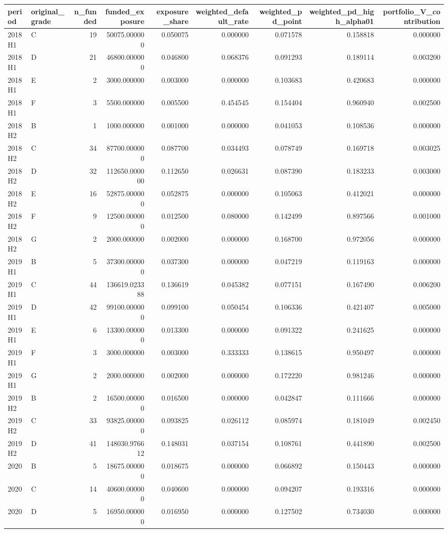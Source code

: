\begin{tabular}{llrrrrrrr}
\toprule
period & original\_grade & n\_funded & funded\_exposure & exposure\_share & weighted\_default\_rate & weighted\_pd\_point & weighted\_pd\_high\_alpha01 & portfolio\_V\_contribution \\
\midrule
2018H1 & C & 19 & 50075.000000 & 0.050075 & 0.000000 & 0.071578 & 0.158818 & 0.000000 \\
2018H1 & D & 21 & 46800.000000 & 0.046800 & 0.068376 & 0.091293 & 0.189114 & 0.003200 \\
2018H1 & E & 2 & 3000.000000 & 0.003000 & 0.000000 & 0.103683 & 0.420683 & 0.000000 \\
2018H1 & F & 3 & 5500.000000 & 0.005500 & 0.454545 & 0.154404 & 0.960940 & 0.002500 \\
2018H2 & B & 1 & 1000.000000 & 0.001000 & 0.000000 & 0.041053 & 0.108536 & 0.000000 \\
2018H2 & C & 34 & 87700.000000 & 0.087700 & 0.034493 & 0.078749 & 0.169718 & 0.003025 \\
2018H2 & D & 32 & 112650.000000 & 0.112650 & 0.026631 & 0.087390 & 0.183233 & 0.003000 \\
2018H2 & E & 16 & 52875.000000 & 0.052875 & 0.000000 & 0.105063 & 0.412021 & 0.000000 \\
2018H2 & F & 9 & 12500.000000 & 0.012500 & 0.080000 & 0.142499 & 0.897566 & 0.001000 \\
2018H2 & G & 2 & 2000.000000 & 0.002000 & 0.000000 & 0.168700 & 0.972056 & 0.000000 \\
2019H1 & B & 5 & 37300.000000 & 0.037300 & 0.000000 & 0.047219 & 0.119163 & 0.000000 \\
2019H1 & C & 44 & 136619.023388 & 0.136619 & 0.045382 & 0.077151 & 0.167490 & 0.006200 \\
2019H1 & D & 42 & 99100.000000 & 0.099100 & 0.050454 & 0.106336 & 0.421407 & 0.005000 \\
2019H1 & E & 6 & 13300.000000 & 0.013300 & 0.000000 & 0.091322 & 0.241625 & 0.000000 \\
2019H1 & F & 3 & 3000.000000 & 0.003000 & 0.333333 & 0.138615 & 0.950497 & 0.000000 \\
2019H1 & G & 2 & 2000.000000 & 0.002000 & 0.000000 & 0.172220 & 0.981246 & 0.000000 \\
2019H2 & B & 2 & 16500.000000 & 0.016500 & 0.000000 & 0.042847 & 0.111666 & 0.000000 \\
2019H2 & C & 33 & 93825.000000 & 0.093825 & 0.026112 & 0.085974 & 0.181049 & 0.002450 \\
2019H2 & D & 41 & 148030.976612 & 0.148031 & 0.037154 & 0.108761 & 0.441890 & 0.002500 \\
2020 & B & 5 & 18675.000000 & 0.018675 & 0.000000 & 0.066892 & 0.150443 & 0.000000 \\
2020 & C & 14 & 40600.000000 & 0.040600 & 0.000000 & 0.094207 & 0.193316 & 0.000000 \\
2020 & D & 5 & 16950.000000 & 0.016950 & 0.000000 & 0.127502 & 0.734030 & 0.000000 \\
\bottomrule
\end{tabular}
